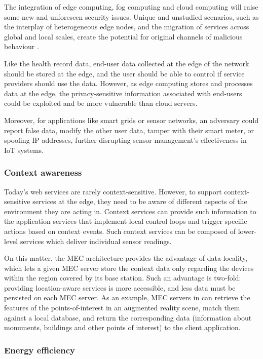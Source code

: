 \documentclass{ieeeaccess}
\begin{document}
The integration of edge computing, fog computing and cloud computing will raise some new and unforeseen security issues. Unique and unstudied scenarios, such as the interplay of heterogeneous edge nodes, and the migration of services across global and local scales, create the potential for original channels of malicious behaviour \cite{edge-computing-survey}.

Like the health record data, end-user data collected at the edge of the network should be stored at the edge, and the user should be able to control if service providers should use the data. However, as edge computing stores and processes data at the edge, the privacy-sensitive information associated with end-users could be exploited and be more vulnerable than cloud servers.

Moreover, for applications like smart grids or sensor networks, an adversary could report false data, modify the other user data, tamper with their smart meter, or spoofing IP addresses, further disrupting sensor management's effectiveness in IoT systems.

\subsubsection{Context awareness}

Today's web services are rarely context-sensitive. However, to support context-sensitive services at the edge, they need to be aware of different aspects of the environment they are acting in. Context services can provide such information to the application services that implement local control loops and trigger specific actions based on context events. Such context services can be composed of lower-level services which deliver individual sensor readings.

On this matter, the MEC architecture provides the advantage of data locality, which lets a given MEC server store the context data only regarding the devices within the region covered by its base station. Such an advantage is two-fold: providing location-aware services is more accessible, and less data must be persisted on each MEC server. As an example, MEC servers in \cite{mobile-augmented-reality} can retrieve the features of the points-of-interest in an augmented reality scene, match them against a local database, and return the corresponding data (information about monuments, buildings and other points of interest) to the client application.

\subsubsection{Energy efficiency}
\end{document}
